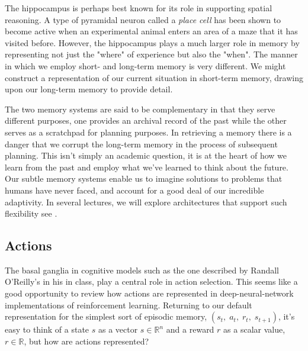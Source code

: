 The hippocampus is perhaps best known for its role in supporting spatial reasoning. A type of pyramidal neuron called a {\it{place cell}} has been shown to become active when an experimental animal enters an area of a maze that it has visited before. However, the hippocampus plays a much larger role in memory by representing not just the "where" of experience but also the "when". The manner in which we employ short- and long-term memory is very different. We might construct a representation of our current situation in short-term memory, drawing upon our long-term memory to provide detail. 

The two memory systems are said to be complementary in that they serve different purposes, one provides an archival record of the past while the other serves as a scratchpad for planning purposes. In retrieving a memory there is a danger that we corrupt the long-term memory in the process of subsequent planning. This isn't simply an academic question, it is at the heart of how we learn from the past and employ what we've learned to think about the future. Our subtle memory systems enable us to imagine solutions to problems that humans have never faced, and account for a good deal of our incredible adaptivity. In several lectures, we will explore architectures that support such flexibility \emdash{} see {{}}.


\subsection{Actions}


The basal ganglia in cognitive models such as the one described by Randall O'Reilly's in his {} in class, play a central role in action selection. This seems like a good opportunity to review how actions are represented in deep-neural-network implementations of reinforcement learning. Returning to our default representation for the simplest sort of episodic memory, $(s_{t},\;a_{t},\;r_{t},\;s_{t+1})$, it's easy to think of a state $s$ as a vector $s \in{} \mathbb{R}^{n}$ and a reward $r$ as a scalar value, $r \in{} \mathbb{R}$, but how are actions represented?

